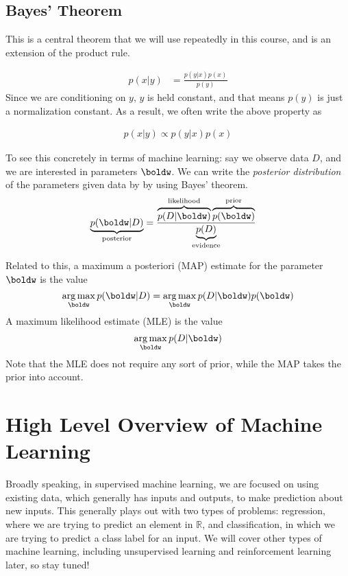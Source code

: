\documentclass[12pt,letterpaper]{article}
\DeclareMathOperator*{\argmax}{arg\,max}
\newcommand{\1}{\mathbbm{1}}
\begin{document}



\subsection{Bayes' Theorem} 
This is a central theorem that we will use repeatedly in this course, and is an extension of the product rule. 

\begin{align*}
  p(x | y) &= \frac{p(y | x) p(x)}{p(y)}
\end{align*}
Since we are conditioning on $y$, $y$ is held constant, and that means $p(y)$ is just a normalization constant. As a result, we often write the above property as

\begin{align*}
  p(x | y) \propto p(y | x) p(x)
\end{align*}

\noindent 
To see this concretely in terms of machine learning: say we observe data $D$, and we are interested in parameters $\boldw$.  We can write the \emph{posterior distribution} of the parameters given data by by using Bayes' theorem.
\begin{align*}
  \underbrace{p(\boldw | D)}_{\text{posterior}}
    &= \frac{\overbrace{ p(D | \boldw) }^{\text{likelihood}} 
       \overbrace{ p(\boldw) }^{\text{prior}}}
       {\underbrace{p(D)}_{\text{evidence}}}
\end{align*}

\noindent Related to this, a maximum a posteriori (MAP) estimate for the parameter $\boldw$ is the value \[\argmax_\boldw p(\boldw | D) = \argmax_\boldw p(D | \boldw)p(\boldw) \] 
A maximum likelihood estimate (MLE) is the value \[\argmax_{\boldw}p(D|\boldw)\]
Note that the MLE does not require any sort of prior, while the MAP takes the prior into account.


\bigskip


\section{High Level Overview of Machine Learning}
Broadly speaking, in supervised machine learning, we are focused on using existing data, which generally has inputs and outputs, to make prediction about new inputs. This generally plays out with two types of problems: regression, where we are trying to predict an element in $\mathbb{R}$, and classification, in which we are trying to predict a class label for an input. We will cover other types of machine learning, including unsupervised learning and reinforcement learning later, so stay tuned!
\end{document}
